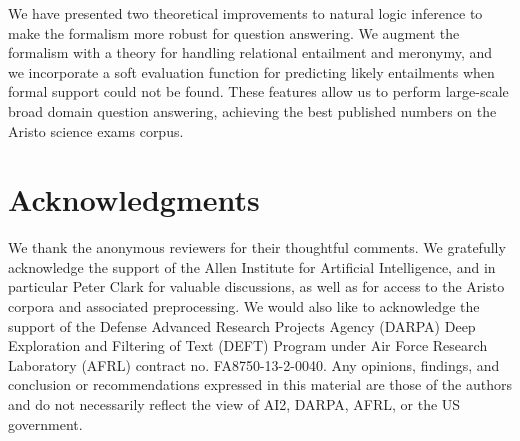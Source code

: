 We have presented two theoretical improvements to natural logic inference to
  make the formalism more robust for question answering.
We augment the formalism with a theory for handling relational entailment and meronymy,
  and we incorporate a soft evaluation function for predicting likely entailments when
  formal support could not be found.
These features allow us to perform large-scale broad domain question answering,
  achieving the best published numbers on the Aristo science exams corpus.


\section*{Acknowledgments}
We thank the anonymous reviewers for their
  thoughtful comments. 
We gratefully acknowledge the support of the Allen Institute
  for Artificial Intelligence, and in particular Peter Clark for
  valuable discussions, as well as for access to the Aristo corpora
  and associated preprocessing.
We would also like to acknowledge the support of the 
  Defense Advanced Research Projects Agency (DARPA) Deep Exploration
  and Filtering of Text (DEFT) Program under
  Air Force Research Laboratory (AFRL) contract
  no. FA8750-13-2-0040. 
Any opinions, findings, and conclusion or recommendations expressed
  in this material are those of the authors and
  do not necessarily reflect the view of AI2, DARPA,
  AFRL, or the US government.

